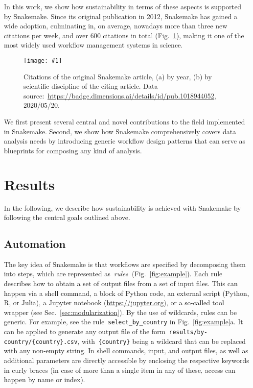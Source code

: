 \documentclass[parskip=half]{scrartcl}
\newcommand{\image}[1]{\centering\texttt{[image: \#1]}}
\let\plainurl\url
\renewcommand{\url}[1]{\protect\plainurl{#1}}
\begin{document}
In this work, we show how sustainability in terms of these aspects is supported by Snakemake.
Since its original publication in 2012, Snakemake has gained a wide adoption, culminating in, on average, nowadays more than three new citations per week, and over 600 citations in total (Fig.~\ref{fig:citations}), making it one of the most widely used workflow management systems in science.

\begin{figure}
	\image{citations.pdf}
	\caption{
		Citations of the original Snakemake article, (a) by year, (b) by scientific discipline of the citing article.
		Data source:~\url{https://badge.dimensions.ai/details/id/pub.1018944052}, 2020/05/20.
	}
	\label{fig:citations}
\end{figure}

We first present several central and novel contributions to the field implemented in Snakemake.
Second, we show how Snakemake comprehensively covers data analysis needs by introducing generic workflow design patterns that can serve as blueprints for composing any kind of analysis.

\section{Results}

In the following, we describe how sustainability is achieved with Snakemake by following the central goals outlined above.

\subsection{Automation}

The key idea of Snakemake is that workflows are specified by decomposing them into steps, which are represented as~\emph{rules~}(Fig.~\ref{fig:example}).
Each rule describes how to obtain a set of output files from a set of input files.
This can happen via a shell command, a block of Python code, an external script (Python, R, or Julia), a Jupyter notebook (\url{https://jupyter.org}), or a so-called tool wrapper (see Sec.~\ref{sec:modularization}).
By the use of wildcards, rules can be generic.
For example, see the rule~\lstinline!select_by_country! in Fig.~\ref{fig:example}a.
It can be applied to generate any output file of the form~\lstinline!results/by-country/{country}.csv!, with~\lstinline!{country}! being a wildcard that can be replaced with any non-empty string.
In shell commands, input, and output files, as well as additional parameters are directly accessible by enclosing the respective keywords in curly braces (in case of more than a single item in any of these, access can happen by name or index).
\end{document}
